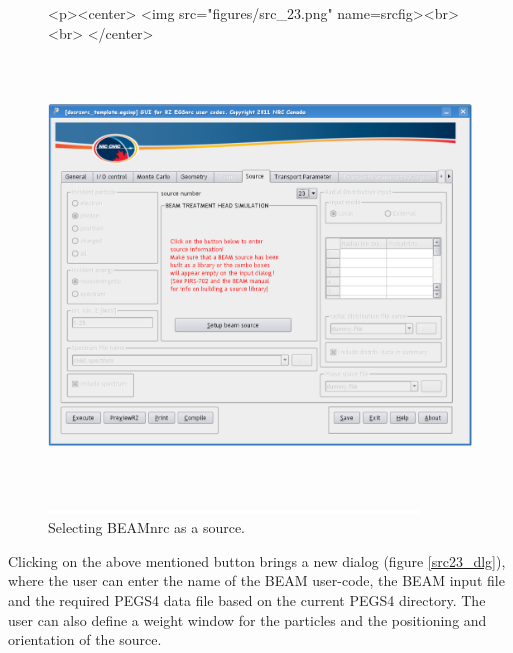 \documentclass[12pt,twoside]{article}   %
\begin{document}
\begin{figure}[htb]
\begin{htmlonly}
\begin{rawhtml}
<p><center>
<img src="figures/src_23.png" name=srcfig><br><br>
</center>
\end{rawhtml}
\end{htmlonly}
\begin{latexonly}
\begin{center}
\includegraphics[height=11.56cm]{figures/src_23}
\end{center}
\end{latexonly}
\begin{center}
\includegraphics[height=1mm]{figures/fake2}
\end{center}
\caption{Selecting BEAMnrc as a source.}
\label{src23_fig}
\end{figure}

Clicking on the above mentioned button brings a new dialog (figure \ref{src23_dlg}),
where the user can enter the name of the BEAM user-code, the BEAM
input file and the required PEGS4 data file based on the current
PEGS4 directory. The user can also define a weight window
for the particles and the positioning and orientation of the
source.
\end{document}
